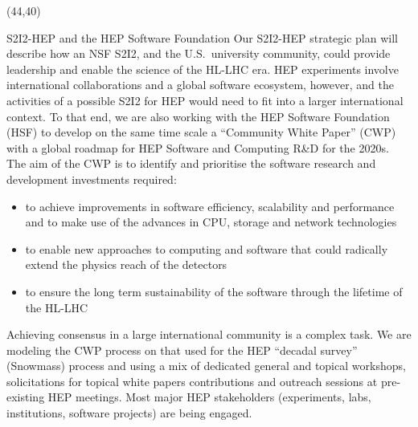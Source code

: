 



\begin{textblock}{38.0}(44,40)
\begin{block}{S2I2-HEP and the HEP Software Foundation}
Our S2I2-HEP strategic plan will describe how an NSF S2I2, and the
U.S.\ university community, could provide leadership and enable the
science of the HL-LHC era.  HEP experiments involve international
collaborations and a global software ecosystem, however, and the
activities of a possible S2I2 for HEP would need to fit into a
larger international context. To that end, we are also working with
the HEP Software Foundation (HSF) to develop on the same time scale
a ``Community White Paper'' (CWP) with a global roadmap for HEP
Software and Computing R\&D for the 2020s. The aim of the CWP is
to identify and prioritise the software research and development
investments required:

\begin{itemize}
\item to achieve improvements in software efficiency, scalability and performance and to make use of the advances in CPU, storage and network technologies
\item to enable new approaches to computing and software that could radically extend the physics reach of the detectors
\item to ensure the long term sustainability of the software through the lifetime of the HL-LHC
\end{itemize}

Achieving consensus in a large international community is a complex task. We are modeling the CWP process on that used for the HEP ``decadal survey'' (Snowmass) process and using a mix of dedicated general and topical workshops, solicitations for topical white papers contributions and outreach sessions at pre-existing HEP meetings. Most major HEP stakeholders (experiments, labs, institutions, software projects) are being engaged.
\end{block}
\end{textblock}

